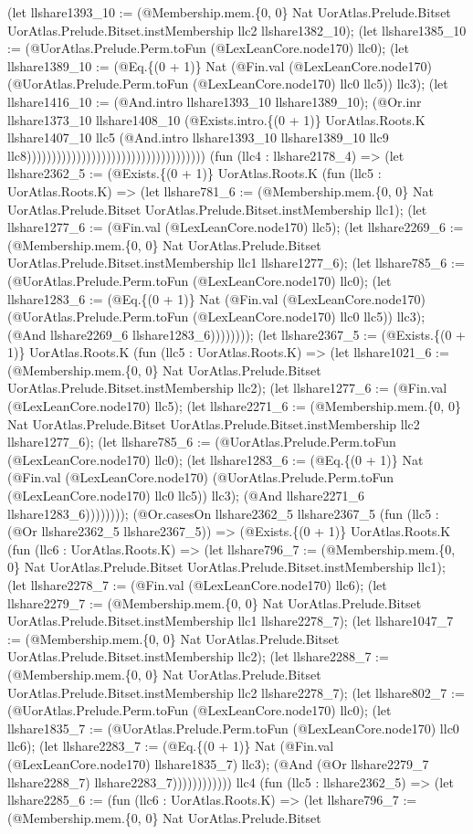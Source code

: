 \documentclass[11pt]{article}
\begin{document}
(let llshare1393\_10 := (@Membership.mem.\{0, 0\} Nat UorAtlas.Prelude.Bitset UorAtlas.Prelude.Bitset.instMembership llc2 llshare1382\_10); (let llshare1385\_10 := (@UorAtlas.Prelude.Perm.toFun (@LexLeanCore.node170) llc0); (let llshare1389\_10 := (@Eq.\{(0 + 1)\} Nat (@Fin.val (@LexLeanCore.node170) (@UorAtlas.Prelude.Perm.toFun (@LexLeanCore.node170) llc0 llc5)) llc3); (let llshare1416\_10 := (@And.intro llshare1393\_10 llshare1389\_10); (@Or.inr llshare1373\_10 llshare1408\_10 (@Exists.intro.\{(0 + 1)\} UorAtlas.Roots.K llshare1407\_10 llc5 (@And.intro llshare1393\_10 llshare1389\_10 llc9 llc8)))))))))))))))))))))))))))))))))))) (fun (llc4 : llshare2178\_4) => (let llshare2362\_5 := (@Exists.\{(0 + 1)\} UorAtlas.Roots.K (fun (llc5 : UorAtlas.Roots.K) => (let llshare781\_6 := (@Membership.mem.\{0, 0\} Nat UorAtlas.Prelude.Bitset UorAtlas.Prelude.Bitset.instMembership llc1); (let llshare1277\_6 := (@Fin.val (@LexLeanCore.node170) llc5); (let llshare2269\_6 := (@Membership.mem.\{0, 0\} Nat UorAtlas.Prelude.Bitset UorAtlas.Prelude.Bitset.instMembership llc1 llshare1277\_6); (let llshare785\_6 := (@UorAtlas.Prelude.Perm.toFun (@LexLeanCore.node170) llc0); (let llshare1283\_6 := (@Eq.\{(0 + 1)\} Nat (@Fin.val (@LexLeanCore.node170) (@UorAtlas.Prelude.Perm.toFun (@LexLeanCore.node170) llc0 llc5)) llc3); (@And llshare2269\_6 llshare1283\_6)))))))); (let llshare2367\_5 := (@Exists.\{(0 + 1)\} UorAtlas.Roots.K (fun (llc5 : UorAtlas.Roots.K) => (let llshare1021\_6 := (@Membership.mem.\{0, 0\} Nat UorAtlas.Prelude.Bitset UorAtlas.Prelude.Bitset.instMembership llc2); (let llshare1277\_6 := (@Fin.val (@LexLeanCore.node170) llc5); (let llshare2271\_6 := (@Membership.mem.\{0, 0\} Nat UorAtlas.Prelude.Bitset UorAtlas.Prelude.Bitset.instMembership llc2 llshare1277\_6); (let llshare785\_6 := (@UorAtlas.Prelude.Perm.toFun (@LexLeanCore.node170) llc0); (let llshare1283\_6 := (@Eq.\{(0 + 1)\} Nat (@Fin.val (@LexLeanCore.node170) (@UorAtlas.Prelude.Perm.toFun (@LexLeanCore.node170) llc0 llc5)) llc3); (@And llshare2271\_6 llshare1283\_6)))))))); (@Or.casesOn llshare2362\_5 llshare2367\_5 (fun (llc5 : (@Or llshare2362\_5 llshare2367\_5)) => (@Exists.\{(0 + 1)\} UorAtlas.Roots.K (fun (llc6 : UorAtlas.Roots.K) => (let llshare796\_7 := (@Membership.mem.\{0, 0\} Nat UorAtlas.Prelude.Bitset UorAtlas.Prelude.Bitset.instMembership llc1); (let llshare2278\_7 := (@Fin.val (@LexLeanCore.node170) llc6); (let llshare2279\_7 := (@Membership.mem.\{0, 0\} Nat UorAtlas.Prelude.Bitset UorAtlas.Prelude.Bitset.instMembership llc1 llshare2278\_7); (let llshare1047\_7 := (@Membership.mem.\{0, 0\} Nat UorAtlas.Prelude.Bitset UorAtlas.Prelude.Bitset.instMembership llc2); (let llshare2288\_7 := (@Membership.mem.\{0, 0\} Nat UorAtlas.Prelude.Bitset UorAtlas.Prelude.Bitset.instMembership llc2 llshare2278\_7); (let llshare802\_7 := (@UorAtlas.Prelude.Perm.toFun (@LexLeanCore.node170) llc0); (let llshare1835\_7 := (@UorAtlas.Prelude.Perm.toFun (@LexLeanCore.node170) llc0 llc6); (let llshare2283\_7 := (@Eq.\{(0 + 1)\} Nat (@Fin.val (@LexLeanCore.node170) llshare1835\_7) llc3); (@And (@Or llshare2279\_7 llshare2288\_7) llshare2283\_7)))))))))))) llc4 (fun (llc5 : llshare2362\_5) => (let llshare2285\_6 := (fun (llc6 : UorAtlas.Roots.K) => (let llshare796\_7 := (@Membership.mem.\{0, 0\} Nat UorAtlas.Prelude.Bitset 
\end{document}
